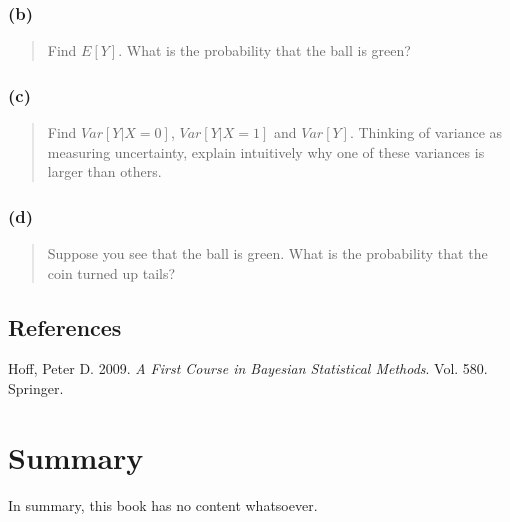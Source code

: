 \documentclass[
  letterpaper,
  DIV=11,
  numbers=noendperiod]{scrreprt}
\newlength{\cslhangindent}
\newlength{\cslentryspacingunit} %
\newenvironment{CSLReferences}[2] %
 {%
  \setlength{\parindent}{0pt}
  \ifodd #1
  \let\oldpar\par
  \def\par{\hangindent=\cslhangindent\oldpar}
  \fi
  \setlength{\parskip}{#2\cslentryspacingunit}
 }%
 {}
\begin{document}
\hypertarget{b-3}{%
\subsection{(b)}\label{b-3}}

\begin{quote}
Find \(E[Y]\). What is the probability that the ball is green?
\end{quote}

\hypertarget{c-2}{%
\subsection{(c)}\label{c-2}}

\begin{quote}
Find \(Var[Y|X=0]\), \(Var[Y|X=1]\) and \(Var[Y]\). Thinking of variance
as measuring uncertainty, explain intuitively why one of these variances
is larger than others.
\end{quote}

\hypertarget{d-1}{%
\subsection{(d)}\label{d-1}}

\begin{quote}
Suppose you see that the ball is green. What is the probability that the
coin turned up tails?
\end{quote}

\hypertarget{references}{%
\section*{References}\label{references}}

\hypertarget{refs}{}
\begin{CSLReferences}{1}{0}
\leavevmode{}%
Hoff, Peter D. 2009. \emph{A First Course in Bayesian Statistical
Methods}. Vol. 580. Springer.

\end{CSLReferences}


\hypertarget{summary}{%
\chapter{Summary}\label{summary}}

In summary, this book has no content whatsoever.
\end{document}
